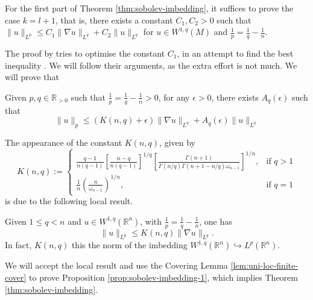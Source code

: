 For the first part of Theorem \ref{thm:sobolev-imbedding}, it suffices to prove the case
\(k=l+1\), that is, there exists a constant \(C_1, C_2>0\) such that
\(\|u\|_{L^p} \leq C_1\|\nabla u\|_{L^q} + C_2\| u\|_{L^q}\) for
\(u\in W^{1,q}(M)\) and \(\frac{1}{p} = \frac{1}{q}-\frac{1}{n}\).

The proof by \cite{aubin_nonlinear_1998} tries to optimise the constant \(C_1\), in an
attempt to find the best inequality \cite[page 50]{aubin_nonlinear_1998}. We will follow
their arguments, as the extra effort is not much. We will prove that

\begin{proposition}
\label{prop:sobolev-imbedding-1}
Given \(p,q\in \mathbb{R}_{>0}\) such that \(\frac{1}{p}=\frac{1}{q} - \frac{1}{n}>0\),
for any \(\epsilon >0\), there exists \(A_q(\epsilon)\) such that
\[
 \|u\|_p \leq (K(n,q) + \epsilon) \|\nabla u\|_{L^q} + A_q(\epsilon) \| u\|_{L^q}
\]
\end{proposition}
The appearance of the constant \(K(n,q)\), given by 
\[
K(n,q):=\begin{cases}
\frac{q-1}{n(q-1)}\left[\frac{n-q}{n(q-1)}\right]^{1/q}\left[\frac{\Gamma(n+1)}{\Gamma(n/q)\Gamma(n+1-n/q)\omega_{n-1}}\right]^{1/n},  & \text{if $q>1$} \\
\frac{1}{n}\left(\frac{n}{\omega_{n-1}}\right)^{1/n}, & \text{if $q=1$}
\end{cases}
\] 
is due to the following local result.
\begin{theorem}[Aubin]
\label{thm:aubin-loc}
Given \(1\leq q < n\) and \(u\in W^{1,q}(\mathbb{R}^n)\), with \(\frac{1}{p}=\frac{1}{q}-\frac{1}{n}\), one has
\[
 \|u\|_{L^p} \leq K(n,q) \|\nabla u\|_{L^q}.
\]
In fact, \(K(n,q)\) this the norm of the imbedding \(W^{1,q}(\mathbb{R}^n) \hookrightarrow L^p(\mathbb{R}^n)\).
\end{theorem}

We will accept the local result and use the Covering Lemma \ref{lem:uni-loc-finite-cover} to
prove Proposition \ref{prop:sobolev-imbedding-1}, which implies Theorem
\ref{thm:sobolev-imbedding}.

